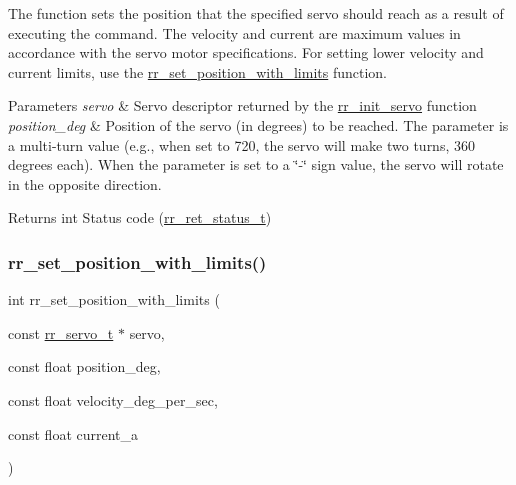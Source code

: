 The function sets the position that the specified servo should reach as a result of executing the command. The velocity and current are maximum values in accordance with the servo motor specifications. For setting lower velocity and current limits, use the \hyperlink{group___motion_ga6927d2a1d6ef5a0564b676817c88b82a}{rr\+\_\+set\+\_\+position\+\_\+with\+\_\+limits} function. 


\begin{DoxyParams}{Parameters}
{\em servo} & Servo descriptor returned by the \hyperlink{group___init_ga0adb313a3eeb8a4399431e940a1f3e9e}{rr\+\_\+init\+\_\+servo} function \\
\hline
{\em position\+\_\+deg} & Position of the servo (in degrees) to be reached. The parameter is a multi-\/turn value (e.\+g., when set to 720, the servo will make two turns, 360 degrees each). When the parameter is set to a \char`\"{}-\/\char`\"{} sign value, the servo will rotate in the opposite direction. \\
\hline
\end{DoxyParams}
\begin{DoxyReturn}{Returns}
int Status code (\hyperlink{api_8h_a92d5be5038abcf89837faf85a08debdc}{rr\+\_\+ret\+\_\+status\+\_\+t}) 
\end{DoxyReturn}
\mbox{\label{group___motion_ga6927d2a1d6ef5a0564b676817c88b82a}} 
\subsubsection{\texorpdfstring{rr\+\_\+set\+\_\+position\+\_\+with\+\_\+limits()}{rr\_set\_position\_with\_limits()}}
{\footnotesize\ttfamily int rr\+\_\+set\+\_\+position\+\_\+with\+\_\+limits (\begin{DoxyParamCaption}\item[{const \hyperlink{structrr__servo__t}{rr\+\_\+servo\+\_\+t} $\ast$}]{servo,  }\item[{const float}]{position\+\_\+deg,  }\item[{const float}]{velocity\+\_\+deg\+\_\+per\+\_\+sec,  }\item[{const float}]{current\+\_\+a }\end{DoxyParamCaption})}



